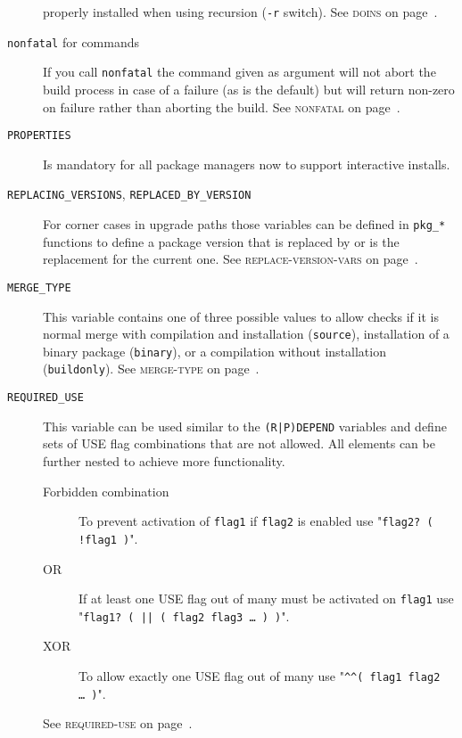 \documentclass[a4paper,notumble]{leaflet}
\newcommand{\code}[1]{\texttt{#1}}
\newcommand{\featureref}[1]{\textsc{#1} on page~\pageref{feat:#1}}
\begin{document}
\begin{description}
    properly installed when using recursion (\code{-r} switch).
    See \featureref{doins}.
    \item[\code{nonfatal} for commands] If you call \code{nonfatal}
    the command given as argument will not abort the build process in
    case of a failure (as is the default) but will return non-zero on
    failure rather than aborting the build.
    See \featureref{nonfatal}.
    \item[\code{PROPERTIES}] Is mandatory for all package managers now
    to support interactive installs.
    \item[\code{REPLACING\_VERSIONS}, \code{REPLACED\_BY\_VERSION}]
    For corner cases in upgrade paths those variables can be defined
    in \code{pkg\_*} functions to define a package version that is
    replaced by or is the replacement for the current one.
    See \featureref{replace-version-vars}.
    \item[\code{MERGE\_TYPE}] This variable contains one of three
    possible values to allow checks if it is normal merge with
    compilation and installation (\code{source}), installation of a
    binary package (\code{binary}), or a compilation without
    installation (\code{buildonly}).  See \featureref{merge-type}.
    \item[\code{REQUIRED\_USE}] This variable can be used similar to
    the \code{(R|P)DEPEND} variables and define sets of USE flag
    combinations that are not allowed.  All elements can be further
    nested to achieve more functionality.
    \begin{description}
        \item[Forbidden combination] To prevent activation of
        \code{flag1} if \code{flag2} is enabled use
        "\code{flag2? ( !flag1 )}".
        \item[OR] If at least one USE flag out of many must be
        activated on \code{flag1} use
        "\code{flag1? ( || ( flag2 flag3 \dots\ ) )}".
        \item[XOR] To allow exactly one USE flag out of many use
        "\code{\textasciicircum\textasciicircum ( flag1 flag2 \dots\ )}".
    \end{description}
    See \featureref{required-use}.
\end{description}
\end{document}
